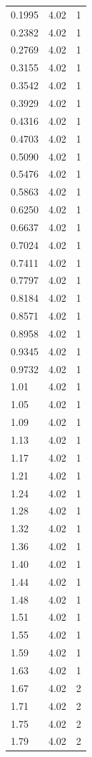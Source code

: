 \begin{longtable}{lrr}
  0.1995 & 4.02 & 1 \\
  0.2382 & 4.02 & 1 \\
  0.2769 & 4.02 & 1 \\
  0.3155 & 4.02 & 1 \\
  0.3542 & 4.02 & 1 \\
  0.3929 & 4.02 & 1 \\
  0.4316 & 4.02 & 1 \\
  0.4703 & 4.02 & 1 \\
  0.5090 & 4.02 & 1 \\
  0.5476 & 4.02 & 1 \\
  0.5863 & 4.02 & 1 \\
  0.6250 & 4.02 & 1 \\
  0.6637 & 4.02 & 1 \\
  0.7024 & 4.02 & 1 \\
  0.7411 & 4.02 & 1 \\
  0.7797 & 4.02 & 1 \\
  0.8184 & 4.02 & 1 \\
  0.8571 & 4.02 & 1 \\
  0.8958 & 4.02 & 1 \\
  0.9345 & 4.02 & 1 \\
  0.9732 & 4.02 & 1 \\
  1.01 & 4.02 & 1 \\
  1.05 & 4.02 & 1 \\
  1.09 & 4.02 & 1 \\
  1.13 & 4.02 & 1 \\
  1.17 & 4.02 & 1 \\
  1.21 & 4.02 & 1 \\
  1.24 & 4.02 & 1 \\
  1.28 & 4.02 & 1 \\
  1.32 & 4.02 & 1 \\
  1.36 & 4.02 & 1 \\
  1.40 & 4.02 & 1 \\
  1.44 & 4.02 & 1 \\
  1.48 & 4.02 & 1 \\
  1.51 & 4.02 & 1 \\
  1.55 & 4.02 & 1 \\
  1.59 & 4.02 & 1 \\
  1.63 & 4.02 & 1 \\
  1.67 & 4.02 & 2 \\
  1.71 & 4.02 & 2 \\
  1.75 & 4.02 & 2 \\
  1.79 & 4.02 & 2 \\

\end{longtable}
